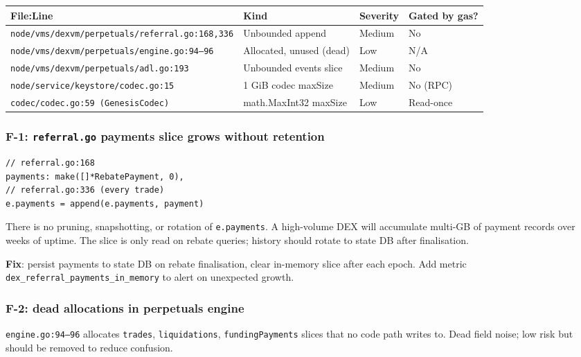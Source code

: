 \documentclass[11pt]{article}
\begin{document}
\begin{table}[h]
\centering
\begin{tabular}{p{6cm}lll}
\toprule
\textbf{File:Line} & \textbf{Kind} & \textbf{Severity} & \textbf{Gated by gas?} \\
\midrule
\texttt{node/vms/dexvm/perpetuals/referral.go:168,336} & Unbounded append & Medium & No \\
\texttt{node/vms/dexvm/perpetuals/engine.go:94--96} & Allocated, unused (dead) & Low & N/A \\
\texttt{node/vms/dexvm/perpetuals/adl.go:193} & Unbounded events slice & Medium & No \\
\texttt{node/service/keystore/codec.go:15} & 1 GiB codec maxSize & Medium & No (RPC) \\
\texttt{codec/codec.go:59 (GenesisCodec)} & math.MaxInt32 maxSize & Low & Read-once \\
\bottomrule
\end{tabular}
\end{table}

\subsubsection{F-1: \texttt{referral.go} payments slice grows without retention}

\begin{lstlisting}
// referral.go:168
payments: make([]*RebatePayment, 0),
// referral.go:336 (every trade)
e.payments = append(e.payments, payment)
\end{lstlisting}

There is no pruning, snapshotting, or rotation of \verb|e.payments|. A
high-volume DEX will accumulate multi-GB of payment records over weeks
of uptime. The slice is only read on rebate queries; history should
rotate to state DB after finalisation.

\textbf{Fix}: persist payments to state DB on rebate finalisation, clear
in-memory slice after each epoch. Add metric
\verb|dex_referral_payments_in_memory| to alert on unexpected growth.

\subsubsection{F-2: dead allocations in perpetuals engine}

\texttt{engine.go:94--96} allocates \verb|trades|, \verb|liquidations|,
\verb|fundingPayments| slices that no code path writes to. Dead field
noise; low risk but should be removed to reduce confusion.
\end{document}
